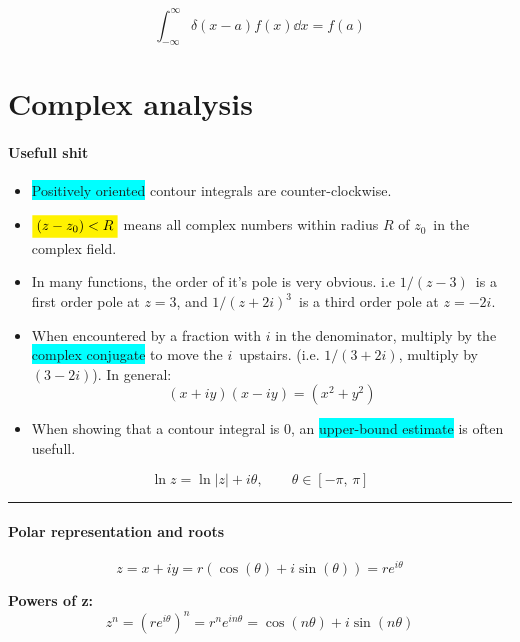 \documentclass[10pt,a4paper]{article}
\renewcommand{\exp}{e^}
\newcommand{\infint}{\int_{-\infty}^{\infty}}
\newcommand{\holine}{\rule{286pt}{1pt}}
\newcommand{\yl}[1]{\colorbox{yellow}{$\displaystyle #1$}}
\newcommand{\bll}{\colorbox{cyan}}
\begin{document}
\begin{multicols}{2}
\[
    \infint \delta(x-a)f(x)\dd{x} = f(a)
\]







\newpage
\part*{Complex analysis}
\subsection*{Usefull shit}

\begin{itemize}
    \item \bll{Positively oriented} contour integrals are counter-clockwise.
    \item $\yl{(z-z_0)<R}$ means all complex numbers within radius $R$ of $z_0$ in the complex field.
    \item In many functions, the order of it's pole is very obvious. i.e $1/(z-3)$ is a first order pole at $z=3$, and $1/(z+2i)^3$ is a third order pole at $z=-2i$.
    \item When encountered by a fraction with $i$ in the denominator, multiply by the \bll{complex conjugate} to move the $i$ upstairs. (i.e. $1/(3+2i)$, multiply by $(3-2i)$). In general:
    \[
        (x+iy)(x-iy) = (x^2 + y^2)
    \]
    \item When showing that a contour integral is 0, an \bll{upper-bound estimate} is often usefull.
\end{itemize}

\[
    \ln{z} = \ln|z| + i\theta, \quad\quad \theta\in[-\pi,\, \pi]
\]



\holine
\subsection*{Polar representation and roots}
\[
    z = x + iy = r(\cos(\theta) + i\sin(\theta)) = r\exp{i\theta}
\]

\textbf{Powers of z:}
\[
    z^n = (r\exp{i\theta})^n = r^n\exp{in\theta} = \cos(n\theta) + i \sin(n\theta)
\]


\end{multicols}
\end{document}
